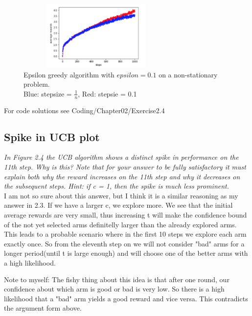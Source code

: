 \documentclass[12pt,a4paper]{article}
\begin{document}
\begin{figure}
	\includegraphics[width=0.7\textwidth, height = 130px]{images/stepsize_comparison_non_stationary.png}
	\caption{Epsilon greedy algorithm with $epsilon = 0.1$ on a non-stationary problem. \\ Blue: stepsize = $\frac{1}{n}$, Red: stepsie = 0.1}
\end{figure}
 
For code solutions see Coding/Chapter02/Exercise2.4


\subsection{Spike in UCB plot}
\textit{In Figure 2.4 the UCB algorithm shows a distinct spike in performance on the 11th step. Why is this? Note that for your answer to be fully satisfactory it must explain both why the reward increases on the 11th step and why it decreases on the subsequent steps. Hint: if c = 1, then the spike is much less prominent.} \\ 

I am not so sure about this answer, but I think it is a similar reasoning as my answer in 2.3. If we have a larger c, we explore more. We see that the initial average rewards are very small, thus increasing t will make the confidence bound of the not yet selected arms definitelly larger than the already explored arms. This leads to a probable scenario where in the first 10 steps we explore each arm exactly once. So from the eleventh step on we will not consider "bad" arms for a longer period(until t is large enough) and will choose one of the better arms with a high likelihood. 

Note to myself: The fishy thing about this idea is that after one round, our confidence about which arm is good or bad is very low. So there is a high likelihood that a "bad" arm yields a good reward and vice versa. This contradicts the argument form above. 
\end{document}
